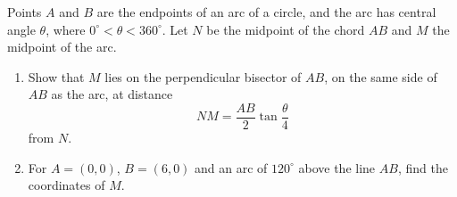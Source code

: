 Points $A$ and $B$ are the endpoints of an arc of a circle, and the arc has central angle $\theta$, where $0^\circ<\theta<360^\circ$. Let $N$ be the midpoint of the chord $AB$ and $M$ the midpoint of the arc.
\begin{enumerate}
\item[(a)] Show that $M$ lies on the perpendicular bisector of $AB$, on the same side of $AB$ as the arc, at distance
\[NM=\dfrac{AB}{2}\tan\dfrac{\theta}{4}\]
from $N$.
\item[(b)] For $A=(0,0)$, $B=(6,0)$ and an arc of $120^\circ$ above the line $AB$, find the coordinates of $M$.
\end{enumerate}
